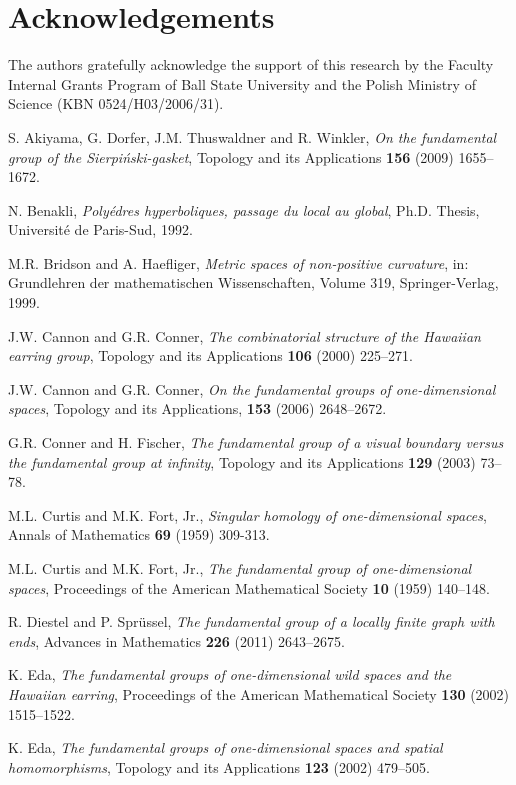 \documentclass{amsart}
\theoremstyle{definition}
\theoremstyle{remark}
\numberwithin{equation}{section}
\begin{document}
\section*{Acknowledgements}
The authors gratefully acknowledge the support of this research by the Faculty Internal Grants Program of Ball State University and the Polish Ministry of Science (KBN 0524/H03/2006/31).

\begin{thebibliography}{00}
 S. Akiyama, G. Dorfer, J.M. Thuswaldner and R. Winkler, {\em On the fundamental group of the Sierpi\'nski-gasket}, Topology and its Applications {\bf 156} (2009) 1655--1672.

 N. Benakli, {\em Poly\'edres hyperboliques, passage du local au global}, Ph.D. Thesis, Universit\'e de Paris-Sud, 1992.

 M.R. Bridson and A. Haefliger, {\em Metric spaces of non-positive curvature}, in: Grundlehren der mathematischen Wissenschaften, Volume 319, Springer-Verlag, 1999.

 J.W. Cannon and G.R. Conner, {\em  The combinatorial structure of the Hawaiian earring group}, Topology and its Applications {\bf 106} (2000) 225--271.

 J.W. Cannon and G.R. Conner,
{\em On the fundamental groups of one-dimensional spaces},
Topology and its Applications, {\bf 153} (2006) 2648--2672.

 G.R. Conner and H. Fischer, {\em The fundamental group of a visual boundary versus the fundamental group at infinity}, Topology and its Applications {\bf 129} (2003) 73--78.

 M.L. Curtis and M.K. Fort, Jr., {\em Singular homology of one-dimensional spaces}, Annals of Mathematics {\bf 69} (1959) 309-313.

 M.L. Curtis and M.K. Fort, Jr., {\em The fundamental group of one-dimensional spaces}, Proceedings of the American Mathematical Society {\bf 10} (1959) 140--148.

 R. Diestel and P. Spr\"ussel, {\em
The fundamental group of a locally finite
graph with ends}, Advances in Mathematics {\bf 226} (2011) 2643--2675.

 K. Eda, {\em  The fundamental groups of one-dimensional wild spaces and the Hawaiian earring}, Proceedings of the American Mathematical Society {\bf 130} (2002) 1515--1522.

 K. Eda, {\em The fundamental groups of one-dimensional spaces and spatial homomorphisms}, Topology and its Applications {\bf 123} (2002) 479--505.


\end{thebibliography}
\end{document}
